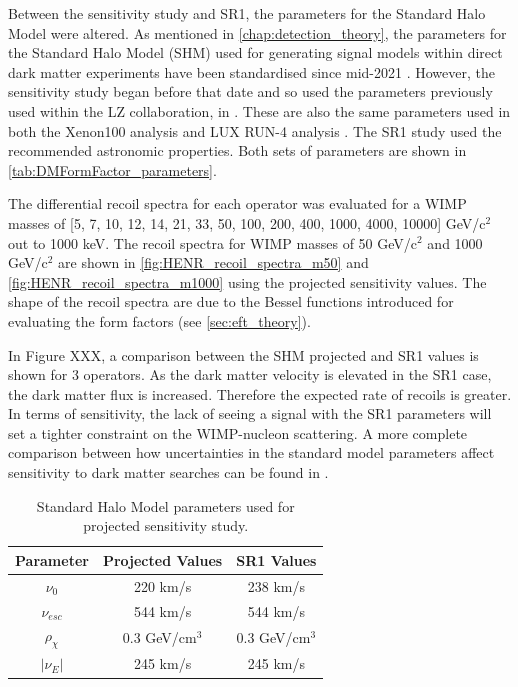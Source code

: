 \par
Between the sensitivity study and SR1, the parameters for the Standard Halo Model were altered.
As mentioned in \autoref{chap:detection_theory}, the parameters for the Standard Halo Model (SHM) used for generating signal models within direct dark matter experiments have been standardised since mid-2021 \cite{standard_halo_model_conventions_ref}.
However, the sensitivity study began before that date and so used the parameters previously used within the LZ collaboration, in \cite{LZ_projected_sensitivity_paper_ref,LZ_TechnicalDesignReview_ref,LZ_Ibles_LZStats_Thesis_ref}.
These are also the same parameters used in both the Xenon100 analysis \cite{xenon100_eft_ref} and LUX RUN-4 analysis \cite{LUX_RUN4_EFT_2021}.
The SR1 study used the recommended astronomic properties.
Both sets of parameters are shown in \autoref{tab:DMFormFactor_parameters}.

\par
The differential recoil spectra for each operator was evaluated for a WIMP masses of [5, 7, 10, 12, 14, 21, 33, 50, 100, 200, 400, 1000, 4000, 10000] GeV/c$^{2}$ out to 1000 keV.
The recoil spectra for WIMP masses of 50 GeV/c$^2$ and 1000 GeV/c$^2$ are shown in \autoref{fig:HENR_recoil_spectra_m50} and \autoref{fig:HENR_recoil_spectra_m1000} using the projected sensitivity values.
The shape of the recoil spectra are due to the Bessel functions introduced for evaluating the form factors (see \autoref{sec:eft_theory}).

\par
In Figure XXX, a comparison between the SHM projected and SR1 values is shown for 3 operators.
As the dark matter velocity is elevated in the SR1 case, the dark matter flux is increased.
Therefore the expected rate of recoils is greater.
In terms of sensitivity, the lack of seeing a signal with the SR1 parameters will set a tighter constraint on the WIMP-nucleon scattering.
A more complete comparison between how uncertainties in the standard model parameters affect sensitivity to dark matter searches can be found in \cite{LZ_Ibles_LZStats_Thesis_ref,billyboxer_thesis_ref}.

\begin{table}[]
    \centering
    \begin{tabular}{c|c|c}
        Parameter         & Projected Values   & SR1 Values       \\ \hline
        $\nu_0$           & 220 km/s           & 238 km/s         \\ 
        $\nu_{esc}$       & 544 km/s           & 544 km/s         \\
        $\rho_{\chi}$     & 0.3 GeV/cm$^{3}$   & 0.3 GeV/cm$^{3}$ \\
        $|\nu_E|$         & 245 km/s           & 245 km/s  
    \end{tabular}
    \caption{Standard Halo Model parameters used for projected sensitivity study.}
    \label{tab:DMFormFactor_parameters}
\end{table}


